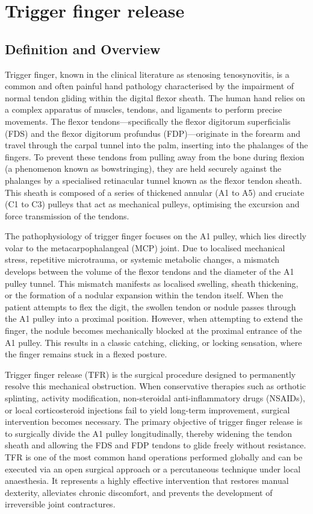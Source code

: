 \chapter{Trigger finger release}

\section*{Definition and Overview}
Trigger finger, known in the clinical literature as stenosing tenosynovitis, is a common and often painful hand pathology characterised by the impairment of normal tendon gliding within the digital flexor sheath. The human hand relies on a complex apparatus of muscles, tendons, and ligaments to perform precise movements. The flexor tendons---specifically the flexor digitorum superficialis (FDS) and the flexor digitorum profundus (FDP)---originate in the forearm and travel through the carpal tunnel into the palm, inserting into the phalanges of the fingers. To prevent these tendons from pulling away from the bone during flexion (a phenomenon known as bowstringing), they are held securely against the phalanges by a specialised retinacular tunnel known as the flexor tendon sheath. This sheath is composed of a series of thickened annular (A1 to A5) and cruciate (C1 to C3) pulleys that act as mechanical pulleys, optimising the excursion and force transmission of the tendons.

The pathophysiology of trigger finger focuses on the A1 pulley, which lies directly volar to the metacarpophalangeal (MCP) joint. Due to localised mechanical stress, repetitive microtrauma, or systemic metabolic changes, a mismatch develops between the volume of the flexor tendons and the diameter of the A1 pulley tunnel. This mismatch manifests as localised swelling, sheath thickening, or the formation of a nodular expansion within the tendon itself. When the patient attempts to flex the digit, the swollen tendon or nodule passes through the A1 pulley into a proximal position. However, when attempting to extend the finger, the nodule becomes mechanically blocked at the proximal entrance of the A1 pulley. This results in a classic catching, clicking, or locking sensation, where the finger remains stuck in a flexed posture.

Trigger finger release (TFR) is the surgical procedure designed to permanently resolve this mechanical obstruction. When conservative therapies such as orthotic splinting, activity modification, non-steroidal anti-inflammatory drugs (NSAIDs), or local corticosteroid injections fail to yield long-term improvement, surgical intervention becomes necessary. The primary objective of trigger finger release is to surgically divide the A1 pulley longitudinally, thereby widening the tendon sheath and allowing the FDS and FDP tendons to glide freely without resistance. TFR is one of the most common hand operations performed globally and can be executed via an open surgical approach or a percutaneous technique under local anaesthesia. It represents a highly effective intervention that restores manual dexterity, alleviates chronic discomfort, and prevents the development of irreversible joint contractures.


